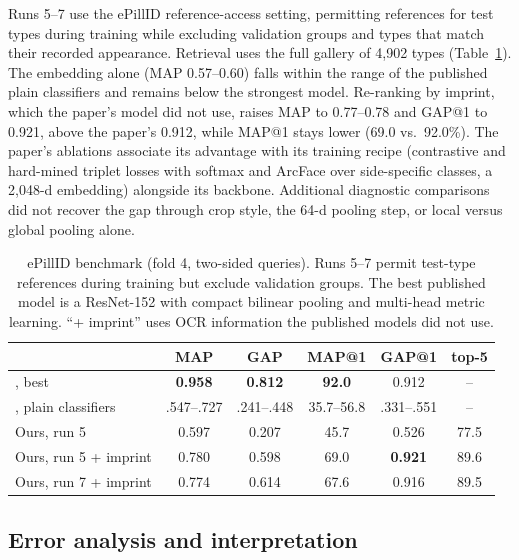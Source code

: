 Runs 5--7 use the ePillID reference-access setting, permitting references for test types during training while excluding validation groups and types that match their recorded appearance. Retrieval uses the full gallery of 4,902 types (Table~\ref{tab:epillid}).
The embedding alone (MAP 0.57--0.60) falls within the range of the published plain classifiers and remains below the strongest model. 
Re-ranking by imprint, which the paper's model did not use, raises MAP to 0.77--0.78 and GAP@1 to 0.921, above the paper's 0.912, while MAP@1 stays lower (69.0 vs.\ 92.0\%). 
The paper's ablations associate its advantage with its training recipe (contrastive and hard-mined triplet losses with softmax and
ArcFace over side-specific classes, a 2,048-d embedding) alongside its backbone. 
Additional diagnostic comparisons did not recover the gap through crop style, the 64-d pooling step, or local versus global pooling alone.

\begin{table}[!htbp]
  \caption{ePillID benchmark (fold 4, two-sided queries). Runs 5--7 permit test-type references during training but exclude validation groups. The best published model is a ResNet-152 with compact
    bilinear pooling and multi-head metric learning. ``+ imprint'' uses OCR information the published models did not
    use.}
  \label{tab:epillid}
  \centering
  \small
  \begin{tabular}{@{}lccccc@{}}
    \toprule
    & MAP & GAP & MAP@1 & GAP@1 & top-5 \\
    \midrule
    \citet{usuyama2020epillid}, best & \textbf{0.958} & \textbf{0.812} & \textbf{92.0} & 0.912 & -- \\
    \citet{usuyama2020epillid}, plain classifiers & .547--.727 & .241--.448 & 35.7--56.8 & .331--.551 & -- \\
    Ours, run 5 & 0.597 & 0.207 & 45.7 & 0.526 & 77.5 \\
    Ours, run 5 + imprint & 0.780 & 0.598 & 69.0 & \textbf{0.921} & 89.6 \\
    Ours, run 7 + imprint & 0.774 & 0.614 & 67.6 & 0.916 & 89.5 \\
    \bottomrule
  \end{tabular}
\end{table}

\FloatBarrier
\subsection{Error analysis and interpretation}
\label{sec:error-analysis}

